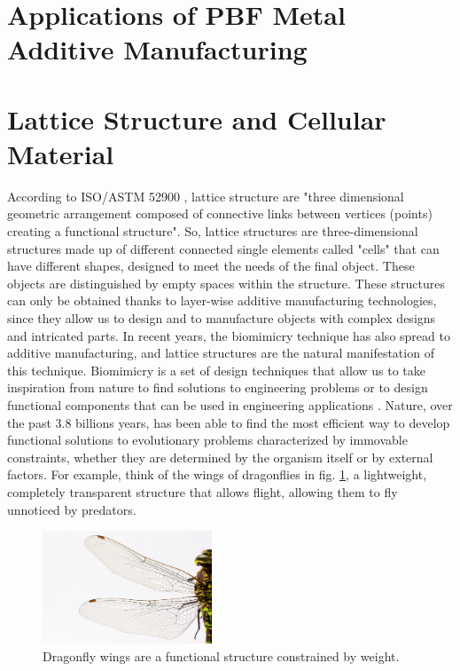 
\section{Applications of PBF Metal Additive Manufacturing}
\label{sec:examplesPBF}


\section{Lattice Structure and Cellular Material} \label{sec:lattice}
According to ISO/ASTM 52900 \cite{international_standard_organization_isoastm_2015}, lattice structure are "three dimensional geometric arrangement composed of connective links between vertices (points) creating a functional structure". So, lattice structures are three-dimensional structures made up of different connected single elements called "cells" that can have different shapes, designed to meet the needs of the final object. These objects are distinguished by empty spaces within the structure. These structures can only be obtained thanks to layer-wise additive manufacturing technologies, since they allow us to design and to manufacture objects with complex designs and intricated parts. In recent years, the biomimicry technique has also spread to additive manufacturing, and lattice structures are the natural manifestation of this technique. Biomimicry is a set of design techniques that allow us to take inspiration from nature to find solutions to engineering problems or to design functional components that can be used in engineering applications \cite{pathak_biomimicry_2019, du_plessis_beautiful_2019}. Nature, over the past 3.8 billions years, has been able to find the most efficient way to develop functional solutions to evolutionary problems characterized by immovable constraints, whether they are determined by the organism itself or by external factors. For example, think of the wings of dragonflies in fig. \ref{fig:dragonfly}, a lightweight, completely transparent structure that allows flight, allowing them to fly unnoticed by predators. 
\begin{figure}[H]
    \centering
    \includegraphics[width=0.45\textwidth]{Images/dragonfly-gf80b992d6_1280.jpg}
    \caption[Dragonfly wings.]{Dragonfly wings are a functional structure constrained by weight.}
    \label{fig:dragonfly}
\end{figure}

